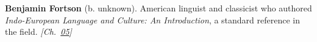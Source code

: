 \textbf{Benjamin Fortson} (b. unknown). American linguist and classicist who authored \emph{Indo-European Language and Culture: An Introduction}, a standard reference in the field. \emph{[Ch.~\hyperref[ch:circlewheel]{05}]}

